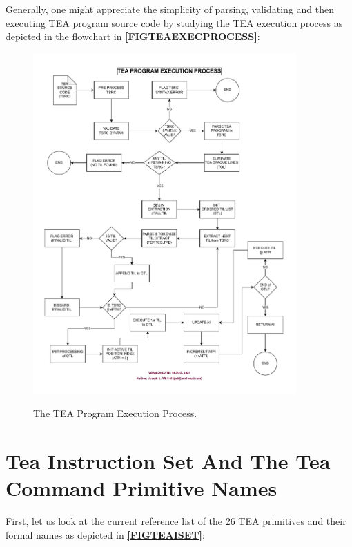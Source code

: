 \documentclass[a4paper, 18pt]{book} %
\begin{document}
Generally, one might appreciate the simplicity of parsing, validating and then executing TEA program source code by studying the TEA execution process as depicted in the flowchart in  \textbf{\autoref{FIGTEAEXECPROCESS}}:


\begin{figure}[H]
  \begin{center}
   \includegraphics[trim=0cm 1cm 0cm 0cm, clip, width=0.9\textwidth,]{resources/pdfs/TEA_PROGRAM_EXEC_PROCESS.pdf}\\
   \caption{The TEA Program Execution Process.}
  \label{FIGTEAEXECPROCESS}
  \end{center}
\end{figure}


\section{Tea Instruction Set And The Tea Command Primitive Names}

First, let us look at the current reference list of the 26 TEA primitives and their formal names as depicted in \textbf{\autoref{FIGTEAISET}}:
\end{document}
